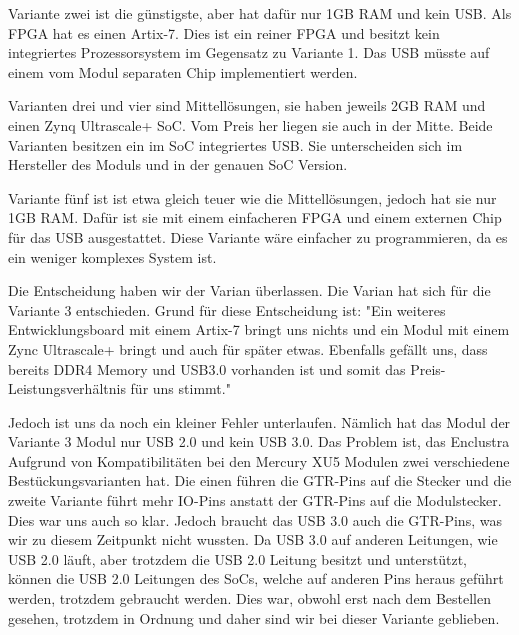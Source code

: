 \documentclass{article}
\begin{document}
    Variante zwei ist die günstigste, aber hat dafür nur 1GB RAM und kein USB. Als FPGA hat es einen Artix-7. Dies ist ein reiner FPGA und besitzt kein integriertes Prozessorsystem im Gegensatz zu Variante 1. Das USB müsste auf einem vom Modul separaten Chip implementiert werden. 
    
    Varianten drei und vier sind Mittellösungen, sie haben jeweils 2GB RAM und einen Zynq Ultrascale+ SoC. Vom Preis her liegen sie auch in der Mitte. Beide Varianten besitzen ein im SoC integriertes USB. Sie unterscheiden sich im Hersteller des Moduls und in der genauen SoC Version.
    
    Variante fünf ist ist etwa gleich teuer wie die Mittellösungen, jedoch hat sie nur 1GB RAM. Dafür ist sie mit einem einfacheren FPGA und einem externen Chip für das USB ausgestattet. Diese Variante wäre einfacher zu programmieren, da es ein weniger komplexes System ist.

    Die Entscheidung haben wir der Varian überlassen. Die Varian hat sich für die Variante 3 entschieden. Grund für diese Entscheidung ist: "Ein weiteres Entwicklungsboard mit einem Artix-7 bringt uns nichts und ein Modul mit einem Zync Ultrascale+ bringt und auch für später etwas. Ebenfalls gefällt uns, dass bereits DDR4 Memory und USB3.0 vorhanden ist und somit das Preis-Leistungsverhältnis für uns stimmt."

    Jedoch ist uns da noch ein kleiner Fehler unterlaufen. Nämlich hat das Modul der Variante 3 Modul nur USB 2.0 und kein USB 3.0. Das Problem ist, das Enclustra Aufgrund von Kompatibilitäten bei den Mercury XU5 Modulen zwei verschiedene Bestückungsvarianten hat. Die einen führen die GTR-Pins auf die Stecker und die zweite Variante führt mehr IO-Pins anstatt der GTR-Pins auf die Modulstecker. Dies war uns auch so klar. Jedoch braucht das USB 3.0 auch die GTR-Pins, was wir zu diesem Zeitpunkt nicht wussten. Da USB 3.0 auf anderen Leitungen, wie USB 2.0 läuft, aber trotzdem die USB 2.0 Leitung besitzt und unterstützt, können die USB 2.0 Leitungen des SoCs, welche auf anderen Pins heraus geführt werden, trotzdem gebraucht werden. Dies war, obwohl erst nach dem Bestellen gesehen, trotzdem in Ordnung und daher sind wir bei dieser Variante geblieben.
    
\end{document}
